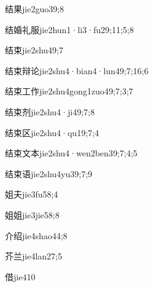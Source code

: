 \begin{verbete}{结果}{jie2guo3}{9;8}
\end{verbete}
\begin{verbete}{结婚礼服}{jie2hun1·li3·fu2}{9;11;5;8}
\end{verbete}
\begin{verbete}{结束}{jie2shu4}{9;7}
\end{verbete}
\begin{verbete}{结束辩论}{jie2shu4·bian4·lun4}{9;7;16;6}
\end{verbete}
\begin{verbete}{结束工作}{jie2shu4gong1zuo4}{9;7;3;7}
\end{verbete}
\begin{verbete}{结束剂}{jie2shu4·ji4}{9;7;8}
\end{verbete}
\begin{verbete}{结束区}{jie2shu4·qu1}{9;7;4}
\end{verbete}
\begin{verbete}{结束文本}{jie2shu4·wen2ben3}{9;7;4;5}
\end{verbete}
\begin{verbete}{结束语}{jie2shu4yu3}{9;7;9}
\end{verbete}
\begin{verbete}{姐夫}{jie3fu5}{8;4}
\end{verbete}
\begin{verbete}{姐姐}{jie3jie5}{8;8}
\end{verbete}
\begin{verbete}{介绍}{jie4shao4}{4;8}
\end{verbete}
\begin{verbete}{芥兰}{jie4lan2}{7;5}
\end{verbete}
\begin{verbete}{借}{jie4}{10}
\end{verbete}
